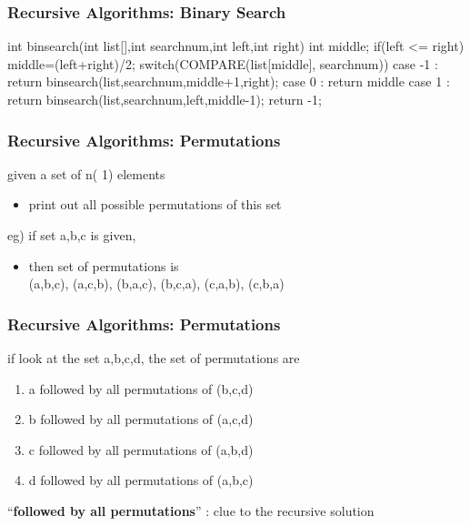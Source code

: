 \documentclass[newPxFont,sthlmFooter,nooffset]{beamer}
\begin{document}
\begin{frame}[t, fragile]
  \frametitle{Recursive Algorithms: Binary Search}
\begin{codedef}
int binsearch(int list[],int searchnum,int left,int right) {
   int middle;
   if(left <= right) {
      middle=(left+right)/2; 
      switch(COMPARE(list[middle], searchnum)) { 
         case -1 : return
            binsearch(list,searchnum,middle+1,right); 
         case 0 : return middle
         case 1 : return
            binsearch(list,searchnum,left,middle-1); 
      }
   }
   return -1; 
}    
\end{codedef}
\end{frame}

\begin{frame}[t]
  \frametitle{Recursive Algorithms: Permutations}
given a set of n( 1) elements 
\begin{itemize}
\item print out all possible permutations of this set
\end{itemize}


eg) if set {a,b,c} is given,
\begin{itemize}
\item then set of permutations is \\
      {(a,b,c), (a,c,b), (b,a,c), (b,c,a),
    (c,a,b), (c,b,a)}
\end{itemize}

\end{frame}

\begin{frame}[t]
  \frametitle{Recursive Algorithms: Permutations}
if look at the set {a,b,c,d}, the set of permutations are

\begin{enumerate}
\item a followed by all permutations of (b,c,d)
\item b followed by all permutations of (a,c,d)
\item c followed by all permutations of (a,b,d)
\item d followed by all permutations of (a,b,c)
\end{enumerate}

``\textbf{followed by all permutations}'' : clue to the recursive solution
\end{frame}
\end{document}
